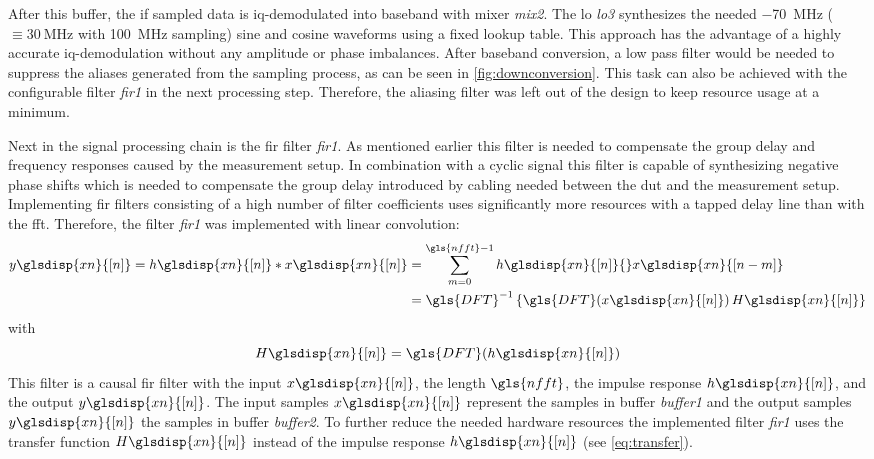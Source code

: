 \documentclass[12pt,a4paper,parskip=full,abstract=true,BCOR=12mm]{scrreprt}
\def\device#1{\mbox{\textit{#1}}}
\newcommand{\XN}{\glsdisp{xn}{[n]}}
\begin{document}
After this buffer, the \gls{if} sampled data is \gls{iq}-demodulated into baseband
with mixer \device{mix2}. The \gls{lo} \device{lo3} synthesizes the needed
\SI{-70}{\mega\hertz} ($\equiv \SI{+30}{\mega\hertz}$ with \SI{100}{\mega\hertz} sampling) sine and cosine waveforms using a fixed lookup table. This
approach has the advantage of a highly accurate
\gls{iq}-demodulation without any amplitude or phase imbalances. After baseband
conversion, a low pass filter would be needed to
suppress the aliases generated from the sampling process, as can be seen in
\cref{fig:downconversion}. This task can also be achieved with the configurable
filter \device{fir1} in the next processing step. Therefore, the aliasing filter
was left out of the design to keep resource usage at a minimum.

Next in the signal processing chain is the \gls{fir} filter \device{fir1}. As mentioned earlier
this filter is needed to compensate the group delay and frequency responses caused by the
measurement setup. In combination with a cyclic signal this filter is capable of synthesizing
negative phase shifts which is needed to compensate the group delay introduced by cabling
needed between the \gls{dut} and the measurement setup.
Implementing \gls{fir} filters consisting of a high number of filter
coefficients uses significantly more resources with a tapped delay line than with
the \gls{fft}. Therefore, the filter \device{fir1} was implemented with linear convolution:
\begin{equation}
    \begin{split}
    \label{eq:circ} y\XN = h\XN * x\XN & = \sum_{m=0}^{\gls{nfft}-1} h\XN{}x\glsdisp{xn}{[n-m]}\\
         & = \gls{DFT}^{-1}\left\{\gls{DFT}(x\XN)\,H\XN\right\}
    \end{split}
\end{equation}
with
\begin{equation}
    \label{eq:transfer} H\XN = \gls{DFT}(h\XN)
\end{equation}
This filter is a causal \gls{fir} filter with the input $x\XN$, the length $\gls{nfft}$,
the impulse response $h\XN$, and the output $y\XN$. The input samples $x\XN$ represent
the samples in buffer \device{buffer1} and the output samples $y\XN$ the samples in
buffer \device{buffer2}. To further reduce the needed hardware resources the implemented
filter \device{fir1} uses the transfer function $H\XN$ instead of the impulse response $h\XN$
(see \cref{eq:transfer}).
\end{document}
